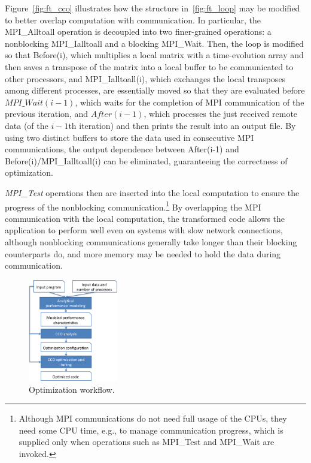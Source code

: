 Figure~\ref{fig:ft_cco} illustrates how the structure
in~\ref{fig:ft_loop} may be modified to better overlap computation
with communication.  In particular, the MPI\_Alltoall operation is
decoupled into two finer-grained operations: a nonblocking
MPI\_Ialltoall and a blocking MPI\_Wait.  Then, the loop is modified
so that Before(i), which multiplies a local matrix with a
time-evolution array and then saves a transpose of the matrix into a
local buffer to be communicated to other processors, and
MPI\_Ialltoall(i), which exchanges the local transposes among different
processes, are essentially moved so that they are evaluated before
$MPI\_Wait(i-1)$, which waits for the completion of MPI communication
of the previous iteration, and $After(i-1)$, which processes the just
received remote data (of the $i-1$th iteration) and then prints the
result into an output file.  By using two distinct buffers to store
the data used in consecutive MPI communications, the output
dependence between After(i-1) and Before(i)/MPI\_Ialltoall(i) can be
eliminated, guaranteeing the correctness of optimization.

\emph{MPI\_Test} operations then are inserted into the local computation to
ensure the progress of the nonblocking
communication.\footnote{Although MPI communications do not need full
  usage of the CPUs, they need some CPU time, e.g., to manage communication
  progress, which is supplied only when operations such as MPI\_Test
  and MPI\_Wait are invoked.}  By overlapping the MPI communication
with the local computation, the transformed code allows the
application to perform well even on systems with slow network
connections, although nonblocking communications generally take longer
than their blocking counterparts do, and more memory may be needed to
hold the data during communication.

\begin{figure}[h]
\centering
\includegraphics[width=0.35\textwidth]{fig/framework.png} %
\caption{Optimization workflow.}
\label{fig:overview}
\end{figure}

